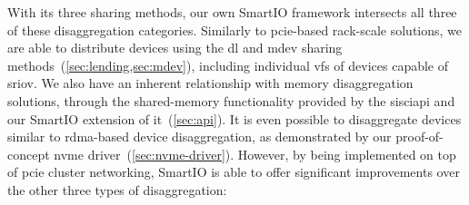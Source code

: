 With its three sharing methods, our own SmartIO framework intersects all three of these \gls{disaggregation} categories.
%
Similarly to \gls{pcie}-based rack-scale solutions, we are able to distribute devices using the \gls{dl} and \gls{mdev} sharing methods~(\cref{sec:lending,sec:mdev}), including individual \glspl{vf} of devices capable of \gls{sriov}.
%
We also have an inherent relationship with memory \gls{disaggregation} solutions, through the shared-memory functionality provided by the \gls{sisciapi} and our SmartIO extension of it~(\cref{sec:api}).
%
It is even possible to \gls{disaggregate} devices similar to \gls{rdma}-based device \gls{disaggregation}, as demonstrated by our proof-of-concept \gls{nvme} driver~(\cref{sec:nvme-driver}).
%
However, by being implemented on top of \gls{pcie} cluster networking, SmartIO is able to offer significant improvements over the other three types of \gls{disaggregation}:
%
